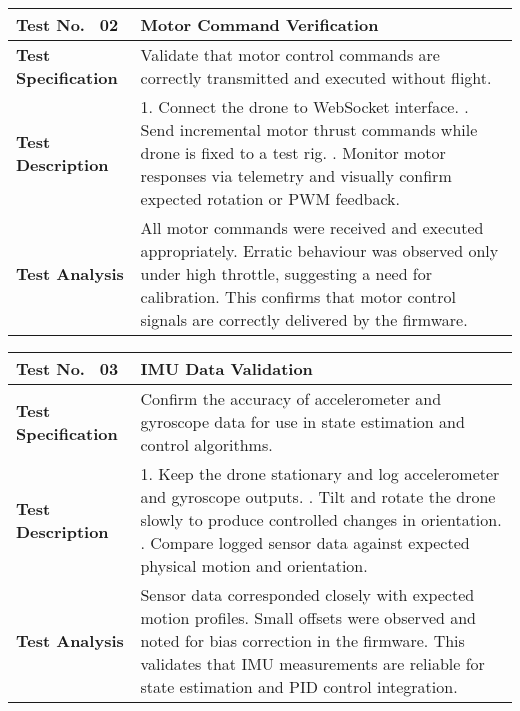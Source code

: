 \begin{table}[H]
\centering
\renewcommand{\arraystretch}{1.2}
\begin{tabular}{|p{3.5cm}|p{12cm}|}
\hline
\textbf{Test No. \, 02} & \textbf{Motor Command Verification} \\ \hline
\textbf{Test Specification} & 
Validate that motor control commands are correctly transmitted and executed without flight. \\ \hline
\textbf{Test Description} & 
1. Connect the drone to WebSocket interface. \newline
2. Send incremental motor thrust commands while drone is fixed to a test rig. \newline
3. Monitor motor responses via telemetry and visually confirm expected rotation or PWM feedback. \\ \hline
\textbf{Test Analysis} & 
All motor commands were received and executed appropriately. Erratic behaviour was observed only under high throttle, suggesting a need for calibration. This confirms that motor control signals are correctly delivered by the firmware. \\ \hline
\end{tabular}
\end{table}

\begin{table}[H]
\centering
\renewcommand{\arraystretch}{1.2}
\begin{tabular}{|p{3.5cm}|p{12cm}|}
\hline
\textbf{Test No. \, 03} & \textbf{IMU Data Validation} \\ \hline
\textbf{Test Specification} & 
Confirm the accuracy of accelerometer and gyroscope data for use in state estimation and control algorithms. \\ \hline
\textbf{Test Description} & 
1. Keep the drone stationary and log accelerometer and gyroscope outputs. \newline
2. Tilt and rotate the drone slowly to produce controlled changes in orientation. \newline
3. Compare logged sensor data against expected physical motion and orientation. \\ \hline
\textbf{Test Analysis} & 
Sensor data corresponded closely with expected motion profiles. Small offsets were observed and noted for bias correction in the firmware. This validates that IMU measurements are reliable for state estimation and PID control integration. \\ \hline
\end{tabular}
\end{table}

